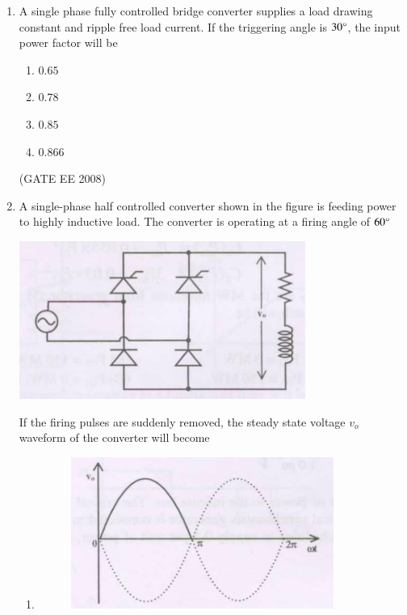 \documentclass[journal,12pt,onecolumn]{IEEEtran}
\theoremstyle{remark}
\begin{document}
\begin{enumerate}[start=1, label=Q.\arabic*]
\item A single phase fully controlled bridge converter supplies a load drawing constant and ripple free load current. If the triggering angle is $30\degree$, the input power factor will be

\begin{multicols}{4}
\begin{enumerate}
    \item $0.65$
    \item $0.78$
    \item $0.85$
    \item $0.866$
\end{enumerate}
\end{multicols}
\hfill (GATE EE 2008)


\item A single-phase half controlled converter shown in the figure is feeding power to highly inductive
load. The converter is operating at a firing angle of $60\degree$
\begin{center}
    \includegraphics[width=\columnwidth]{Fig/q56.png}
    \caption{}
\end{center}
If the firing pulses are suddenly removed, the steady state voltage $v_o$ waveform of the converter
will become
\begin{enumerate}
        
    \item 
    \begin{figure}[H]
        \includegraphics[width=\columnwidth]{Fig/q56-A.png}\caption{}
    \end{figure}



\end{enumerate}
\end{enumerate}
\end{document}
